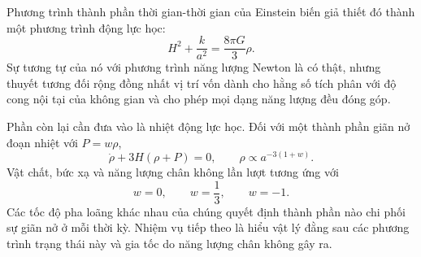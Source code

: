 Phương trình thành phần thời gian-thời gian của Einstein biến giả thiết đó thành một phương trình động lực học:
\begin{equation}
H^2+\frac{k}{a^2}=\frac{8\pi G}{3}\rho.
\end{equation}
Sự tương tự của nó với phương trình năng lượng Newton là có thật, nhưng thuyết tương đối rộng đồng nhất vị trí vốn dành cho hằng số tích phân với độ cong nội tại của không gian và cho phép mọi dạng năng lượng đều đóng góp.

Phần còn lại cần đưa vào là nhiệt động lực học. Đối với một thành phần giãn nở đoạn nhiệt với \(P=w\rho\),
\begin{equation}
\dot\rho+3H(\rho+P)=0,
\qquad
\rho\propto a^{-3(1+w)}.
\end{equation}
Vật chất, bức xạ và năng lượng chân không lần lượt tương ứng với
\begin{equation}
w=0,\qquad w=\frac13,\qquad w=-1.
\end{equation}
Các tốc độ pha loãng khác nhau của chúng quyết định thành phần nào chi phối sự giãn nở ở mỗi thời kỳ. Nhiệm vụ tiếp theo là hiểu vật lý đằng sau các phương trình trạng thái này và gia tốc do năng lượng chân không gây ra.
